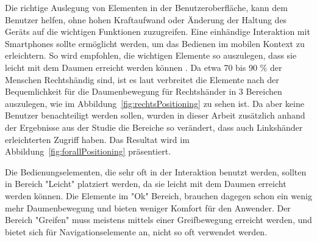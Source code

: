 Die richtige Auslegung von Elementen in der Benutzeroberfläche, kann dem Benutzer helfen, ohne hohen Kraftaufwand oder Änderung der Haltung des Geräts auf die wichtigen Funktionen zuzugreifen. Eine einhändige Interaktion mit Smartphones sollte ermöglicht werden, um das Bedienen im mobilen Kontext zu erleichtern. So wird empfohlen, die wichtigen Elemente so auszulegen, dass sie leicht mit dem Daumen erreicht werden können \cite[Seite 209]{mobileFrontier}. Da etwa 70 bis 90 $\%$ der Menschen Rechtshändig sind, ist es laut \cite[Seite 72]{mobileFirst} verbreitet die Elemente nach der Bequemlichkeit für die Daumenbewegung für Rechtshänder in 3 Bereichen auszulegen, wie im Abbildung~\ref{fig:rechtsPositioning} zu sehen ist. Da aber keine Benutzer benachteiligt werden sollen, wurden in dieser Arbeit zusätzlich anhand der Ergebnisse aus der Studie \cite{Park:2010tu} die Bereiche so verändert, dass auch Linkshänder erleichterten Zugriff haben. Das  Resultat wird im Abbildung~\ref{fig:forallPositioning}\cite[Seite 72]{mobileFirst} präsentiert.

Die Bedienungselementen, die sehr oft in der Interaktion benutzt werden, sollten in Bereich "Leicht" platziert werden, da sie leicht mit dem Daumen erreicht werden können. Die Elemente im "Ok" Bereich, brauchen dagegen schon ein wenig mehr Daumenbewegung und bieten weniger Komfort für den Anwender. Der Bereich "Greifen" muss meistens mittels einer Greifbewegung erreicht werden, und bietet sich für Navigationselemente an, nicht so oft verwendet werden.

